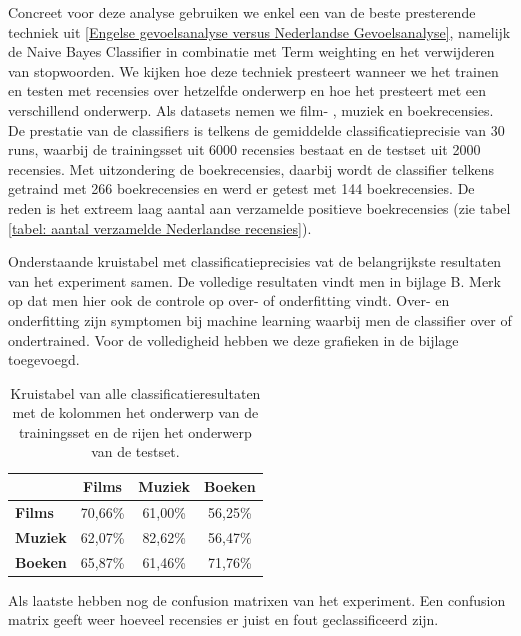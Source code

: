 Concreet voor deze analyse gebruiken we enkel een van de beste presterende techniek uit \ref{Engelse gevoelsanalyse versus Nederlandse Gevoelsanalyse}, namelijk de Naive Bayes Classifier in combinatie met Term weighting en het verwijderen van stopwoorden. We kijken hoe deze techniek presteert wanneer we het trainen en testen met recensies over hetzelfde onderwerp en hoe het presteert met een verschillend onderwerp.  Als datasets nemen we film- , muziek en boekrecensies. De prestatie van de classifiers is telkens de gemiddelde classificatieprecisie van 30 runs, waarbij de trainingsset uit 6000 recensies bestaat en de testset uit 2000 recensies. Met uitzondering de boekrecensies, daarbij wordt de classifier telkens getraind met 266 boekrecensies en werd er getest met 144 boekrecensies. De reden is het extreem laag aantal aan verzamelde positieve boekrecensies (zie tabel \ref{tabel: aantal verzamelde Nederlandse recensies}).


Onderstaande kruistabel met classificatieprecisies vat de belangrijkste resultaten van het experiment samen. De volledige resultaten vindt men in bijlage B. Merk op dat men hier ook de controle op over- of onderfitting vindt. Over- en onderfitting zijn symptomen bij machine learning waarbij men de classifier over of ondertrained. Voor de volledigheid hebben we deze grafieken in de bijlage toegevoegd.    

\begin{table}[h]
\centering
\begin{tabular}{l|c|c|c|}
\cline{2-4}
                                      & \textbf{Films} & \textbf{Muziek} & \textbf{Boeken} \\ \hline
\multicolumn{1}{|l|}{\textbf{Films}} & 70,66\%         & 61,00\%         & 56,25\%         \\ \hline
\multicolumn{1}{|l|}{\textbf{Muziek}} & 62,07\%         & 82,62\%         & 56,47\%         \\ \hline
\multicolumn{1}{|l|}{\textbf{Boeken}} & 65,87\%         & 61,46\%         & 71,76\%         \\ \hline
\end{tabular}
\label{tab:alles}
\caption{Kruistabel van alle classificatieresultaten met de kolommen het onderwerp van de trainingsset en de rijen het onderwerp van de testset.} 
\end{table}

Als laatste hebben nog de confusion matrixen van het experiment. Een confusion matrix geeft weer hoeveel recensies er juist en fout geclassificeerd zijn. 

